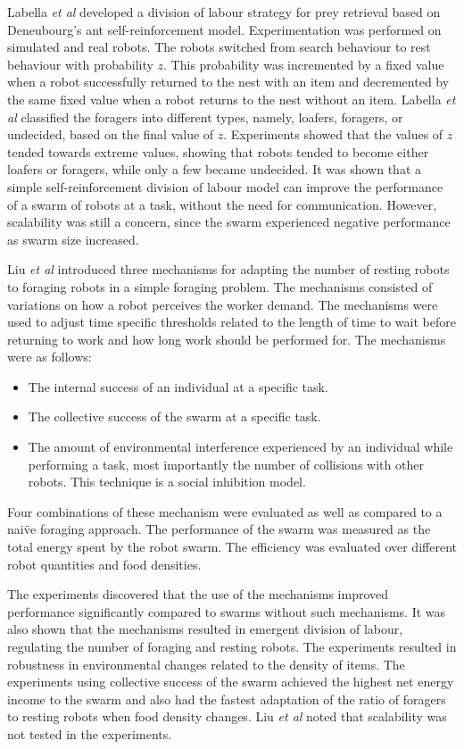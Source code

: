 \documentclass[preprint,12pt]{elsarticle}
\begin{document}
Labella \textit{et al} \cite{labella2006division} developed a division of labour strategy for prey retrieval based on Deneubourg's ant self-reinforcement model. Experimentation was performed on simulated and real robots. The robots switched from search behaviour to rest behaviour with probability $z$. This probability was incremented by a fixed value when a robot successfully returned to the nest with an item and decremented by the same fixed value when a robot returns to the nest without an item. Labella \textit{et al} classified the foragers into different types, namely, loafers, foragers, or undecided, based on the final value of $z$. Experiments showed that the values of $z$ tended towards extreme values, showing that robots tended to become either loafers or foragers, while only a few became undecided. It was shown that a simple self-reinforcement division of labour model can improve the performance of a swarm of robots at a task, without the need for communication. However, scalability was still a concern, since the swarm experienced negative performance as swarm size increased. 

Liu \textit{et al} \cite{liu2007towards} introduced three mechanisms for adapting the number of resting robots to foraging robots in a simple foraging problem. The mechanisms consisted of variations on how a robot perceives the worker demand. The mechanisms were used to adjust time specific thresholds related to the length of time to wait before returning to work and how long work should be performed for. The mechanisms were as follows:

\begin{itemize}
	\item The internal success of an individual at a specific task.
	\item The collective success of the swarm at a specific task. 
	\item The amount of environmental interference experienced by an individual while performing a task, most importantly the number of collisions with other robots. This technique is a social inhibition model.
\end{itemize}

Four combinations of these mechanism were evaluated as well as compared to a nai\"ve foraging approach. The performance of the swarm was measured as the total energy spent by the robot swarm. The efficiency was evaluated over different robot quantities and food densities.

The experiments discovered that the use of the mechanisms improved performance significantly compared to swarms without such mechanisms. It was also shown that the mechanisms resulted in emergent division of labour, regulating the number of foraging and resting robots. The experiments resulted in robustness in environmental changes related to the density of items. The experiments using collective success of the swarm achieved the highest net energy income to the swarm and also had the fastest adaptation of the ratio of foragers to resting robots when food density changes. Liu \textit{et al} \cite{liu2007towards} noted that scalability was not tested in the experiments.
\end{document}

